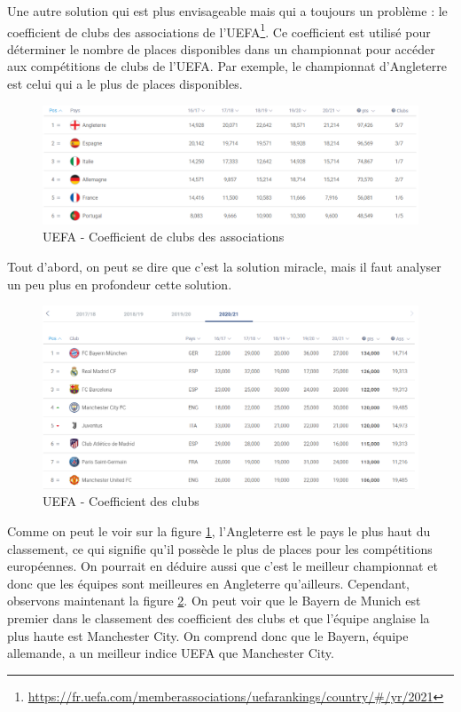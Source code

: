 \documentclass[a4paper,14pt]{extarticle}
\begin{document}
{Une autre solution qui est plus envisageable mais qui a toujours un problème : le coefficient de clubs des associations de l'UEFA\footnote{\url{https://fr.uefa.com/memberassociations/uefarankings/country/\#/yr/2021}}. Ce coefficient est utilisé pour déterminer le nombre de places disponibles dans un championnat pour accéder aux compétitions de clubs de l'UEFA. Par exemple, le championnat d'Angleterre est celui qui a le plus de places disponibles.

\begin{figure}[htp]
    \centering
    \includegraphics[width=16cm]{../img/coeffClubAssoc.png}
    \caption{UEFA - Coefficient de clubs des associations}
    \label{fig:coeffClubsAssoc}
\end{figure}

Tout d'abord, on peut se dire que c'est la solution miracle, mais il faut analyser un peu plus en profondeur cette solution.

\begin{figure}[htp]
    \centering
    \includegraphics[width=16cm]{../img/coeffClubs.png}
    \caption{UEFA - Coefficient des clubs}
    \label{fig:coeffClubs}
\end{figure}

Comme on peut le voir sur la figure \ref{fig:coeffClubsAssoc}, l'Angleterre est le pays le plus haut du classement, ce qui signifie qu'il possède le plus de places pour les compétitions européennes. On pourrait en déduire aussi que c'est le meilleur championnat et donc que les équipes sont meilleures en Angleterre qu'ailleurs. Cependant, observons maintenant la figure \ref{fig:coeffClubs}. On peut voir que le Bayern de Munich est premier dans le classement des coefficient des clubs et que l'équipe anglaise la plus haute est Manchester City. On comprend donc que le Bayern, équipe allemande, a un meilleur indice UEFA que Manchester City.

}
\end{document}
